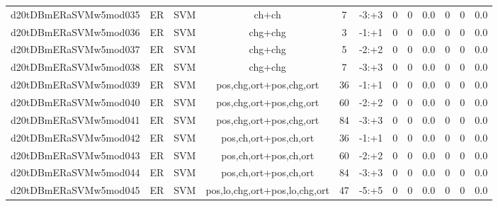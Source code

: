 \documentclass[a4paper]{article}
\begin{document}
\begin{landscape}
\begin{center}
\begin{tabular}{ |c|c|c|c|c|c|c|c|c|c|c|c|}
 
 	
 	\small{ d20tDBmERaSVMw5mod035 } & ER & SVM & ch+ch  &  7 &  -3:+3  &  0 & 0 & 0.0  &  0 & 0 & 0.0 \\
 	

 
 	
 	\small{ d20tDBmERaSVMw5mod036 } & ER & SVM & chg+chg  &  3 &  -1:+1  &  0 & 0 & 0.0  &  0 & 0 & 0.0 \\
 	

 
 	
 	\small{ d20tDBmERaSVMw5mod037 } & ER & SVM & chg+chg  &  5 &  -2:+2  &  0 & 0 & 0.0  &  0 & 0 & 0.0 \\
 	

 
 	
 	\small{ d20tDBmERaSVMw5mod038 } & ER & SVM & chg+chg  &  7 &  -3:+3  &  0 & 0 & 0.0  &  0 & 0 & 0.0 \\
 	

 
 	
 	\small{ d20tDBmERaSVMw5mod039 } & ER & SVM & pos,chg,ort+pos,chg,ort  &  36 &  -1:+1  &  0 & 0 & 0.0  &  0 & 0 & 0.0 \\
 	

 
 	
 	\small{ d20tDBmERaSVMw5mod040 } & ER & SVM & pos,chg,ort+pos,chg,ort  &  60 &  -2:+2  &  0 & 0 & 0.0  &  0 & 0 & 0.0 \\
 	

 
 	
 	\small{ d20tDBmERaSVMw5mod041 } & ER & SVM & pos,chg,ort+pos,chg,ort  &  84 &  -3:+3  &  0 & 0 & 0.0  &  0 & 0 & 0.0 \\
 	

 
 	
 	\small{ d20tDBmERaSVMw5mod042 } & ER & SVM & pos,ch,ort+pos,ch,ort  &  36 &  -1:+1  &  0 & 0 & 0.0  &  0 & 0 & 0.0 \\
 	

 
 	
 	\small{ d20tDBmERaSVMw5mod043 } & ER & SVM & pos,ch,ort+pos,ch,ort  &  60 &  -2:+2  &  0 & 0 & 0.0  &  0 & 0 & 0.0 \\
 	

 
 	
 	\small{ d20tDBmERaSVMw5mod044 } & ER & SVM & pos,ch,ort+pos,ch,ort  &  84 &  -3:+3  &  0 & 0 & 0.0  &  0 & 0 & 0.0 \\
 	

 
 	
 	\small{ d20tDBmERaSVMw5mod045 } & ER & SVM & pos,lo,chg,ort+pos,lo,chg,ort  &  47 &  -5:+5  &  0 & 0 & 0.0  &  0 & 0 & 0.0 \\
 	


\end{tabular}
\end{center}
\end{landscape}
\end{document}
